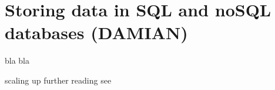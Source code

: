 \section{Storing data in SQL and noSQL databases (DAMIAN)}
\label{sec:databases}


bla bla

scaling up \cite{Trilling2018b}
further reading see \cite{Gunther1018}
